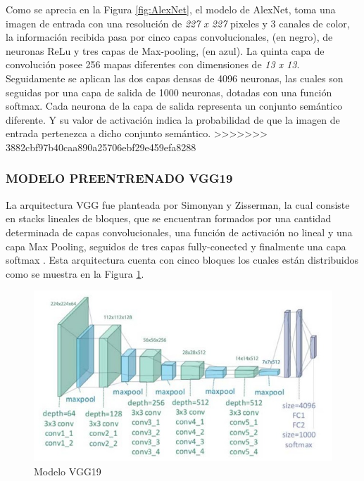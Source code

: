 				Como se aprecia en la Figura \ref{fig:AlexNet}, el modelo de AlexNet, toma una imagen de entrada con una resolución de \textit{227 x 227} pixeles y 3 canales de color, la información recibida pasa por cinco capas convolucionales, (en negro), de neuronas ReLu y tres capas de Max-pooling, (en azul). La quinta capa de convolución posee 256 mapas diferentes con dimensiones de \textit{13 x 13}. Seguidamente se aplican las dos capas densas de 4096 neuronas, las cuales son seguidas por una capa de salida de 1000 neuronas, dotadas con una función softmax. Cada neurona de la capa de salida representa un conjunto semántico diferente. Y su valor de activación indica la probabilidad de que la imagen de entrada pertenezca a dicho conjunto semántico.
>>>>>>> 3882cbf97b40caa890a25706ebf29e459efa8288
		

			\subsubsection{\MakeUppercase{Modelo preentrenado VGG19}}
			
				La arquitectura VGG fue planteada por Simonyan y Zisserman, la cual consiste en stacks lineales de bloques, que se encuentran formados por una cantidad determinada de capas convolucionales, una función de activación no lineal y una capa Max Pooling, seguidos de tres capas fully-conected y finalmente una capa softmax \cite{ref_2}. Esta arquitectura cuenta con cinco bloques los cuales están distribuidos como se muestra en la Figura \ref{fig:VGG19}.
				
				\newpage
				\begin{figure}[ht]
					\centering
					\includegraphics[scale=0.45]{Figs/22.jpeg}
					\caption{Modelo VGG19}
					\label{fig:VGG19}
				\end{figure}			
				
